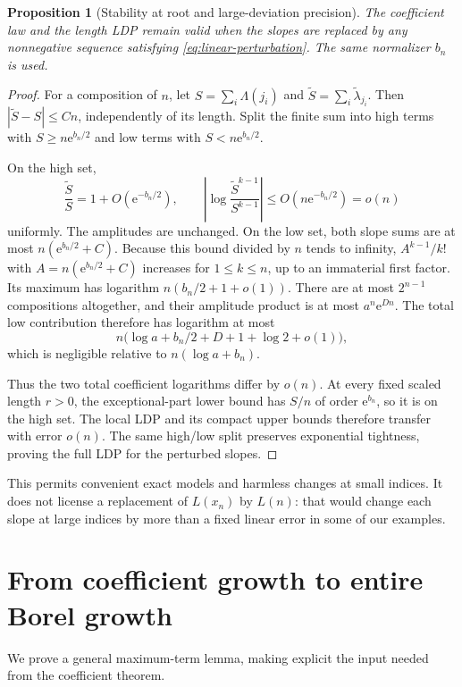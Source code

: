 \documentclass[11pt,a4paper]{article}
\numberwithin{equation}{section}
\newtheorem{proposition}[theorem]{Proposition}
\theoremstyle{definition}
\theoremstyle{remark}
\newcommand{\ee}{\mathrm e}
\begin{document}
\begin{proposition}[Stability at root and large-deviation precision]
\label{prop:robustness}
The coefficient law and the length LDP remain valid when the slopes are
replaced by any nonnegative sequence satisfying
\eqref{eq:linear-perturbation}. The same normalizer $b_n$ is used.
\end{proposition}
\begin{proof}
For a composition of $n$, let $S=\sum_i\Lambda(j_i)$ and
$\widetilde S=\sum_i\widetilde\lambda_{j_i}$. Then
$|\widetilde S-S|\le Cn$, independently of its length.
Split the finite sum into high terms with $S\ge n\ee^{b_n/2}$ and low
terms with $S<n\ee^{b_n/2}$.

On the high set,
\[
 \frac{\widetilde S}{S}=1+O(\ee^{-b_n/2}),
 \qquad
 \left|\log\frac{\widetilde S^{k-1}}{S^{k-1}}\right|
 \le O(n\ee^{-b_n/2})=o(n)
\]
uniformly. The amplitudes are unchanged.
On the low set, both slope sums are at most
$n(\ee^{b_n/2}+C)$. Because this bound divided by $n$ tends to infinity,
$A^{k-1}/k!$ with $A=n(\ee^{b_n/2}+C)$ increases for $1\le k\le n$,
up to an immaterial first factor. Its maximum has logarithm
$n(b_n/2+1+o(1))$. There are at most $2^{n-1}$ compositions altogether,
and their amplitude product is at most $a^n\ee^{Dn}$.
The total low contribution therefore has logarithm at most
\[
 n\bigl(\log a+b_n/2+D+1+\log2+o(1)\bigr),
\]
which is negligible relative to $n(\log a+b_n)$.

Thus the two total coefficient logarithms differ by $o(n)$.
At every fixed scaled length $r>0$, the exceptional-part lower bound
has $S/n$ of order $\ee^{b_n}$, so it is on the high set. The local LDP
and its compact upper bounds therefore transfer with error $o(n)$.
The same high/low split preserves exponential tightness, proving the
full LDP for the perturbed slopes.
\end{proof}

This permits convenient exact models and harmless changes at small
indices. It does not license a replacement of $L(x_n)$ by $L(n)$:
that would change each slope at large indices by more than a fixed
linear error in some of our examples.

\section{From coefficient growth to entire Borel growth}
\label{sec:borel-proof}

We prove a general maximum-term lemma, making explicit the input needed
from the coefficient theorem.
\end{document}

